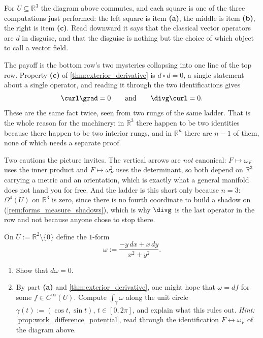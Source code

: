 \begin{importantremark}
\label{rem:one_theorem_four_costumes_forms}
For $U \subseteq \mathbb{R}^3$ the diagram above commutes, and each square is one of the three
computations just performed: the left square is item \textbf{(a)}, the middle is item
\textbf{(b)}, the right is item \textbf{(c)}. Read downward it says that the classical vector
operators are $d$ in disguise, and that the disguise is nothing but the choice of which object to
call a vector field.

The payoff is the bottom row's two mysteries collapsing into one line of the top row. Property
\textbf{(c)} of \cref{thm:exterior_derivative} is $d \circ d = 0$, a single statement about a
single
operator, and reading it through the two identifications gives
\[\curl\grad = 0 \qquad\text{and}\qquad \divg\curl = 0.\]
These are the same fact twice, seen from two rungs of the same ladder. That is the whole reason
for the machinery: in $\mathbb{R}^3$ there happen to be two identities because there happen to be
two interior rungs, and in $\mathbb{R}^n$ there are $n-1$ of them, none of which needs a separate
proof.

Two cautions the picture invites. The vertical arrows are \emph{not} canonical: $F \mapsto
\omega_F$ uses the inner product and $F \mapsto \omega_F^2$ uses the determinant, so both depend
on $\mathbb{R}^3$ carrying a metric and an orientation, which is exactly what a general manifold
does not hand you for free. And the ladder is this short only because $n = 3$: $\Omega^4(U)$ on
$\mathbb{R}^3$ is zero, since there is no fourth coordinate to build a shadow on
(\cref{rem:forms_measure_shadows}), which is why $\divg$ is the last operator in the row and not
because anyone chose to stop there.
\end{importantremark}

\begin{aiexercise}
\label{ex:ai_angle_form_closed}
On $U := \mathbb{R}^2\setminus\{0\}$ define the $1$-form
\[\omega := \frac{-y\,dx + x\,dy}{x^2+y^2}.\]
\begin{enumerate}[label=\textbf{(\alph*)}]
  \item Show that $d\omega = 0$.
  \item By part \textbf{(a)} and \cref{thm:exterior_derivative}, one might hope that
    $\omega = df$ for some
    $f \in C^\infty(U)$. Compute $\int_\gamma \omega$ along the unit circle
    $\gamma(t) := (\cos t, \sin t)$, $t \in [0,2\pi]$, and explain what this rules out.
    \emph{Hint:} \cref{prop:work_difference_potential}, read through the identification
    $F \leftrightarrow \omega_F$ of the diagram above.
\end{enumerate}
\end{aiexercise}

